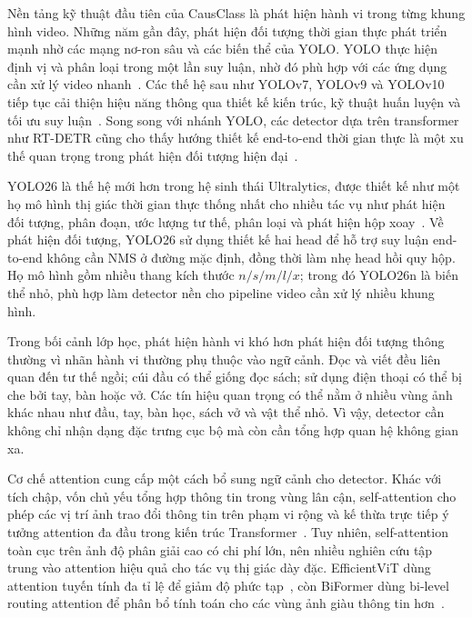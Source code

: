 Nền tảng kỹ thuật đầu tiên của CausClass là phát hiện hành vi trong từng khung hình video. Những năm gần đây, phát hiện đối tượng thời gian thực phát triển mạnh nhờ các mạng nơ-ron sâu và các biến thể của YOLO. YOLO thực hiện định vị và phân loại trong một lần suy luận, nhờ đó phù hợp với các ứng dụng cần xử lý video nhanh \,\cite{redmon2016yolo}. Các thế hệ sau như YOLOv7, YOLOv9 và YOLOv10 tiếp tục cải thiện hiệu năng thông qua thiết kế kiến trúc, kỹ thuật huấn luyện và tối ưu suy luận \,\cite{wang2023yolov7,wang2024yolov9,wang2024yolov10}. Song song với nhánh YOLO, các detector dựa trên transformer như RT-DETR cũng cho thấy hướng thiết kế end-to-end thời gian thực là một xu thế quan trọng trong phát hiện đối tượng hiện đại \,\cite{zhao2024rtdetr}.

YOLO26 là thế hệ mới hơn trong hệ sinh thái Ultralytics, được thiết kế như một họ mô hình thị giác thời gian thực thống nhất cho nhiều tác vụ như phát hiện đối tượng, phân đoạn, ước lượng tư thế, phân loại và phát hiện hộp xoay \,\cite{jocher2026ultralyticsyolo26unifiedrealtime}. Về phát hiện đối tượng, YOLO26 sử dụng thiết kế hai head để hỗ trợ suy luận end-to-end không cần NMS ở đường mặc định, đồng thời làm nhẹ head hồi quy hộp. Họ mô hình gồm nhiều thang kích thước \(n/s/m/l/x\); trong đó YOLO26n là biến thể nhỏ, phù hợp làm detector nền cho pipeline video cần xử lý nhiều khung hình.

Trong bối cảnh lớp học, phát hiện hành vi khó hơn phát hiện đối tượng thông thường vì nhãn hành vi thường phụ thuộc vào ngữ cảnh. Đọc và viết đều liên quan đến tư thế ngồi; cúi đầu có thể giống đọc sách; sử dụng điện thoại có thể bị che bởi tay, bàn hoặc vở. Các tín hiệu quan trọng có thể nằm ở nhiều vùng ảnh khác nhau như đầu, tay, bàn học, sách vở và vật thể nhỏ. Vì vậy, detector cần không chỉ nhận dạng đặc trưng cục bộ mà còn cần tổng hợp quan hệ không gian xa.

Cơ chế attention cung cấp một cách bổ sung ngữ cảnh cho detector. Khác với tích chập, vốn chủ yếu tổng hợp thông tin trong vùng lân cận, self-attention cho phép các vị trí ảnh trao đổi thông tin trên phạm vi rộng và kế thừa trực tiếp ý tưởng attention đa đầu trong kiến trúc Transformer \,\cite{vaswani2017attention}. Tuy nhiên, self-attention toàn cục trên ảnh độ phân giải cao có chi phí lớn, nên nhiều nghiên cứu tập trung vào attention hiệu quả cho tác vụ thị giác dày đặc. EfficientViT dùng attention tuyến tính đa tỉ lệ để giảm độ phức tạp \,\cite{cai2023efficientvit}, còn BiFormer dùng bi-level routing attention để phân bổ tính toán cho các vùng ảnh giàu thông tin hơn \,\cite{zhu2023biformer}.

